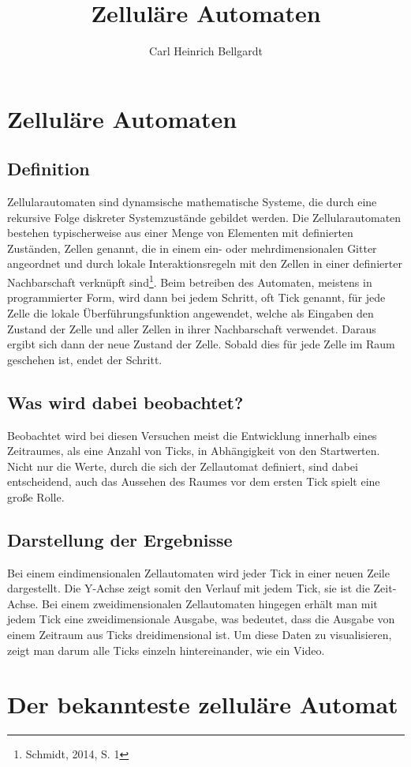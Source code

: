 \documentclass[12pt]{article}
\begin{document}
	
\title{Zelluläre Automaten}
\author{Carl Heinrich Bellgardt}	
	
\section{Zelluläre Automaten}
\subsection{Definition}
	\glqq Zellularautomaten sind dynamsische mathematische Systeme, die durch eine rekursive Folge diskreter Systemzustände gebildet werden. Die Zellularautomaten bestehen typischerweise aus einer Menge von Elementen mit definierten Zuständen, Zellen genannt, die in einem ein- oder mehrdimensionalen Gitter angeordnet und durch lokale Interaktionsregeln mit den Zellen in einer definierter Nachbarschaft verknüpft sind\footnote{Schmidt, 2014, S. 1}.\grqq{} Beim betreiben des Automaten, meistens in programmierter Form, wird dann bei jedem Schritt, oft Tick genannt, für jede Zelle die lokale Überführungsfunktion angewendet, welche als Eingaben den Zustand der Zelle und aller Zellen in ihrer Nachbarschaft verwendet. Daraus ergibt sich dann der neue Zustand der Zelle. Sobald dies für jede Zelle im Raum geschehen ist, endet der Schritt.
\subsection{Was wird dabei beobachtet?}
	Beobachtet wird bei diesen Versuchen meist die Entwicklung innerhalb eines Zeitraumes, als eine Anzahl von Ticks, in Abhängigkeit von den Startwerten. Nicht nur die Werte, durch die sich der Zellautomat definiert, sind dabei entscheidend, auch das Aussehen des Raumes vor dem ersten Tick spielt eine große Rolle.
\subsection{Darstellung der Ergebnisse}
	Bei einem eindimensionalen Zellautomaten wird jeder Tick in einer neuen Zeile dargestellt. Die Y-Achse zeigt somit den Verlauf mit jedem Tick, sie ist die Zeit-Achse. Bei einem zweidimensionalen Zellautomaten hingegen erhält man mit jedem Tick eine zweidimensionale Ausgabe, was bedeutet, dass die Ausgabe von einem Zeitraum aus Ticks dreidimensional ist. Um diese Daten zu visualisieren, zeigt man darum alle Ticks einzeln hintereinander, wie ein Video.

\newpage

\section{Der bekannteste zelluläre Automat}
\end{document}
